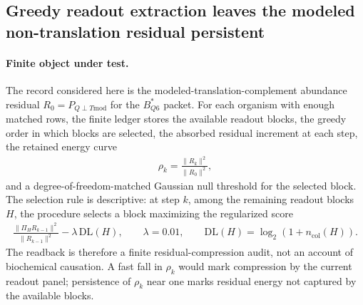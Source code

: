 \subsection{Greedy readout extraction leaves the modeled non-translation residual persistent}
\label{subsec:q6-residual-basis-extraction-greedy-readout-cross-layer}

\paragraph{Finite object under test.}
The record considered here is the modeled-translation-complement abundance residual $R_0=P_{Q\perp T\mathrm{mod}}$ for the $B^*_{Q6}$ packet.  For each organism with enough matched rows, the finite ledger stores the available readout blocks, the greedy order in which blocks are selected, the absorbed residual increment at each step, the retained energy curve
$$
\begin{aligned}
  \rho_k = \frac{\lVert R_k\rVert^2}{\lVert R_0\rVert^2},
\end{aligned}
$$
and a degree-of-freedom-matched Gaussian null threshold for the selected block.  The selection rule is descriptive: at step $k$, among the remaining readout blocks $H$, the procedure selects a block maximizing the regularized score
$$
\begin{aligned}
  \frac{\lVert \Pi_H R_{k-1}\rVert^2}{\lVert R_{k-1}\rVert^2} - \lambda\,\mathrm{DL}(H),
  \qquad
  \lambda = 0.01,
  \qquad
  \mathrm{DL}(H)=\log_2(1+n_{\mathrm{col}}(H)).
\end{aligned}
$$
The readback is therefore a finite residual-compression audit, not an account of biochemical causation.  A fast fall in $\rho_k$ would mark compression by the current readout panel; persistence of $\rho_k$ near one marks residual energy not captured by the available blocks.

